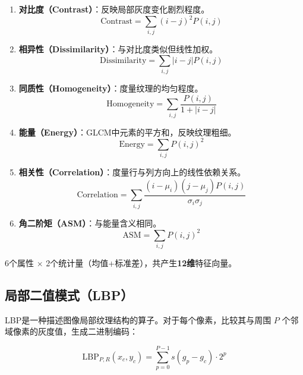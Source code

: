 \documentclass[12pt,a4paper]{ctexart}
\begin{document}
\begin{enumerate}[label=(\arabic*)]
    \item \textbf{对比度（Contrast）}：反映局部灰度变化剧烈程度。
    \begin{equation}
        \text{Contrast} = \sum_{i,j} (i-j)^2 P(i,j)
    \end{equation}

    \item \textbf{相异性（Dissimilarity）}：与对比度类似但线性加权。
    \begin{equation}
        \text{Dissimilarity} = \sum_{i,j} |i-j| P(i,j)
    \end{equation}

    \item \textbf{同质性（Homogeneity）}：度量纹理的均匀程度。
    \begin{equation}
        \text{Homogeneity} = \sum_{i,j} \frac{P(i,j)}{1 + |i-j|}
    \end{equation}

    \item \textbf{能量（Energy）}：GLCM中元素的平方和，反映纹理粗细。
    \begin{equation}
        \text{Energy} = \sum_{i,j} P(i,j)^2
    \end{equation}

    \item \textbf{相关性（Correlation）}：度量行与列方向上的线性依赖关系。
    \begin{equation}
        \text{Correlation} = \sum_{i,j} \frac{(i-\mu_i)(j-\mu_j)P(i,j)}{\sigma_i \sigma_j}
    \end{equation}

    \item \textbf{角二阶矩（ASM）}：与能量含义相同。
    \begin{equation}
        \text{ASM} = \sum_{i,j} P(i,j)^2
    \end{equation}
\end{enumerate}

6个属性 $\times$ 2个统计量（均值+标准差），共产生\textbf{12维}特征向量。

\subsection{局部二值模式（LBP）}

LBP是一种描述图像局部纹理结构的算子。对于每个像素，比较其与周围 $P$ 个邻域像素的灰度值，生成二进制编码：

\begin{equation}
    \text{LBP}_{P,R}(x_c,y_c) = \sum_{p=0}^{P-1} s(g_p - g_c) \cdot 2^p
\end{equation}
\end{document}
